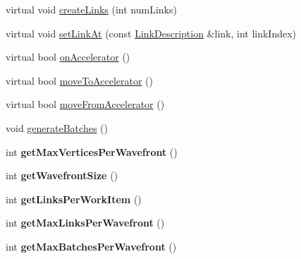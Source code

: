 \begin{DoxyCompactItemize}
\item 
virtual void \hyperlink{classbtSoftBodyLinkDataDX11SIMDAware_ab8d378a7cbe3425a7fc56e133b678b8e}{create\+Links} (int num\+Links)
\item 
virtual void \hyperlink{classbtSoftBodyLinkDataDX11SIMDAware_ae43f275f9bc20e56ace8b3223b263ce4}{set\+Link\+At} (const \hyperlink{classbtSoftBodyLinkData_1_1LinkDescription}{Link\+Description} \&link, int link\+Index)
\item 
virtual bool \hyperlink{classbtSoftBodyLinkDataDX11SIMDAware_a3e740fcbea59c3d0b79f27df3fe8c40d}{on\+Accelerator} ()
\item 
virtual bool \hyperlink{classbtSoftBodyLinkDataDX11SIMDAware_a693af44067395dc322c7cd575f79b980}{move\+To\+Accelerator} ()
\item 
virtual bool \hyperlink{classbtSoftBodyLinkDataDX11SIMDAware_a939884d3e31eb6599b71e466e96f9fc9}{move\+From\+Accelerator} ()
\item 
void \hyperlink{classbtSoftBodyLinkDataDX11SIMDAware_ac22f881862e6a2c2f7e57b8e50044827}{generate\+Batches} ()
\item 
\mbox{\label{classbtSoftBodyLinkDataDX11SIMDAware_a4bd59ce080fe45412bcba9e571ba7ec5}} 
int {\bfseries get\+Max\+Vertices\+Per\+Wavefront} ()
\item 
\mbox{\label{classbtSoftBodyLinkDataDX11SIMDAware_a65ef737048647732582654d261507431}} 
int {\bfseries get\+Wavefront\+Size} ()
\item 
\mbox{\label{classbtSoftBodyLinkDataDX11SIMDAware_ac47628aa9649a869e5083a1001ac1cd1}} 
int {\bfseries get\+Links\+Per\+Work\+Item} ()
\item 
\mbox{\label{classbtSoftBodyLinkDataDX11SIMDAware_aba00f381da3b24c99d418acf9a76374c}} 
int {\bfseries get\+Max\+Links\+Per\+Wavefront} ()
\item 
\mbox{\label{classbtSoftBodyLinkDataDX11SIMDAware_ae4e98917c9f9602c42a6a1b550284a9f}} 
int {\bfseries get\+Max\+Batches\+Per\+Wavefront} ()
\item 
\mbox{\label{classbtSoftBodyLinkDataDX11SIMDAware_a235246a60a82333a369be2ddc5eb950e}} 

\end{DoxyCompactItemize}
